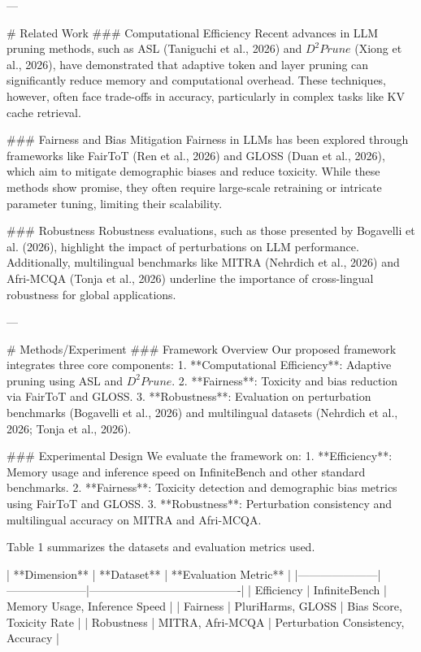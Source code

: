 ---

# Related Work  
### Computational Efficiency  
Recent advances in LLM pruning methods, such as ASL (Taniguchi et al., 2026) and $D^2Prune$ (Xiong et al., 2026), have demonstrated that adaptive token and layer pruning can significantly reduce memory and computational overhead. These techniques, however, often face trade-offs in accuracy, particularly in complex tasks like KV cache retrieval.

### Fairness and Bias Mitigation  
Fairness in LLMs has been explored through frameworks like FairToT (Ren et al., 2026) and GLOSS (Duan et al., 2026), which aim to mitigate demographic biases and reduce toxicity. While these methods show promise, they often require large-scale retraining or intricate parameter tuning, limiting their scalability.

### Robustness  
Robustness evaluations, such as those presented by Bogavelli et al. (2026), highlight the impact of perturbations on LLM performance. Additionally, multilingual benchmarks like MITRA (Nehrdich et al., 2026) and Afri-MCQA (Tonja et al., 2026) underline the importance of cross-lingual robustness for global applications.

---

# Methods/Experiment  
### Framework Overview  
Our proposed framework integrates three core components:  
1. **Computational Efficiency**: Adaptive pruning using ASL and $D^2Prune$.  
2. **Fairness**: Toxicity and bias reduction via FairToT and GLOSS.  
3. **Robustness**: Evaluation on perturbation benchmarks (Bogavelli et al., 2026) and multilingual datasets (Nehrdich et al., 2026; Tonja et al., 2026).

### Experimental Design  
We evaluate the framework on:  
1. **Efficiency**: Memory usage and inference speed on InfiniteBench and other standard benchmarks.  
2. **Fairness**: Toxicity detection and demographic bias metrics using FairToT and GLOSS.  
3. **Robustness**: Perturbation consistency and multilingual accuracy on MITRA and Afri-MCQA.  

Table 1 summarizes the datasets and evaluation metrics used.

| **Dimension**      | **Dataset**         | **Evaluation Metric**                  |  
|---------------------|---------------------|----------------------------------------|  
| Efficiency          | InfiniteBench       | Memory Usage, Inference Speed         |  
| Fairness            | PluriHarms, GLOSS   | Bias Score, Toxicity Rate             |  
| Robustness          | MITRA, Afri-MCQA    | Perturbation Consistency, Accuracy    |  

